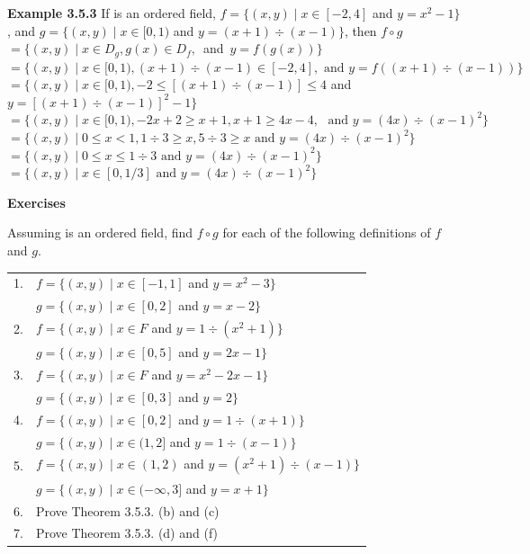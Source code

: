\begin{large}
\textbf{Example 3.5.3}  If \of is an ordered field, $f = \{ (x,y) \mid x\in [-2, 4]$ and $y = x^{2} - 1 \}$, and
$g = \{ (x,y) \mid x \in [0, 1) $ and $y = (x + 1)\div (x - 1)\}$, then \nl
$f\circ g$ \nl
$= \{ (x, y) \mid x\in D_{g}, g(x) \in D_{f},$~and~$y = f(g(x)) \}$\nl
$=\{ (x, y) \mid x\in [0,1) , (x+1)\div (x-1)  \in [-2, 4],\text{~and~}y = f((x+1)\div(x-1))\}$\nl
$= \{ (x, y) \mid x\in [0, 1), -2\leq [(x+1)\div (x-1)]\leq 4$ and \nl
$ $ \hfill $y = [(x+1)\div (x-1)]^{2}- 1\}$\nl
$= \{ (x, y) \mid x\in [0, 1),-2x + 2 \geq x + 1, x+ 1 \geq 4x - 4,\text{ ~and~}y = (4x)\div (x-1)^{2} \}$\nl
$= \{ (x, y) \mid 0 \leq x < 1, 1\div 3 \geq x, 5\div 3 \geq x\text{~and~} y = (4x)\div (x-1)^{2} \}$\nl
$= \{ (x, y) \mid 0 \leq x \leq 1\div 3\text{~and~}y = (4x)\div (x-1)^{2} \}$\nl
$= \{ (x, y) \mid x\in [0, 1/3]\text{~and~}y = (4x)\div (x-1)^{2} \}$\nl





\newpage

\textbf{Exercises}\nl

Assuming \of is an ordered field, find $f\circ g$ for each of the following definitions of $f$ and $g$.\nl
\begin{tabular}{l l}
1.& $f = \{ (x,y) \mid x\in [-1, 1] $ and $y = x^{2} - 3 \}$\\
&$g= \{(x,y) \mid x\in [0,2]$ and $y = x -2\}$\\
2.& $f= \{(x,y) \mid x\in F$ and $y =1\div (x^{2} + 1)\}$ \\
&$g= \{(x,y) \mid x\in  [0,5]$ and $y = 2x - 1\}$\\
3. &	$f = \{(x,y)\mid x\in F$ and $y =x^{2}-2x-1 \}$\\
&$g =\{(x,y) \mid x\in [0,3]$ and $y = 2\}$\\

4. &$f=\{(x,y) \mid x\in [0,2]$ and $y = 1\div (x+1)\} $\\
&$g= \{(x,y) \mid x\in (1,2]$ and $y =1 \div (x-1)\}$\\

5. 	&$f= \{(x,y) \mid x\in (1,2)$ and $y=(x^2 + 1)\div (x-1)\}$\\
&$g= \{(x,y) \mid x\in (-\infty,3]$ and $y = x + 1\} $\\

6.& 	Prove Theorem 3.5.3. (b) and (c) \\

7.& 	Prove Theorem 3.5.3. (d) and (f) \\


\end{tabular}
\end{large}
